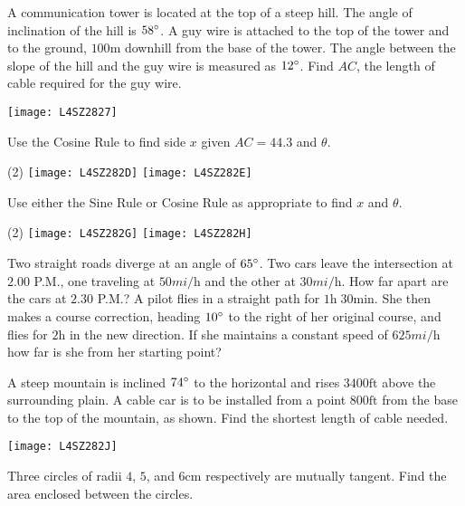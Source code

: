 \begin{Exercise}[title={Applications},label=exApplications]
\begin{multicols}{2}
	\Question A communication tower is located at the top of a steep hill. The angle of inclination
	of the hill is $58 \mbox{{\ensuremath{{}^\circ}}}$. A guy wire is attached to the top of the tower and to the ground, $100 \mbox{m}$ downhill from the base of the tower. The angle between the slope of the hill and the guy wire is measured as $12 \mbox{{\ensuremath{{}^\circ}}}$. Find $A C$, the length of cable required for the guy wire. %
	\columnbreak 
	
	\texttt{[image: L4SZ2827]}	\\
\end{multicols}	
	\Question Use the Cosine Rule to find side $x$ given $AC=44.3$ and $\theta$. 
\begin{tasks}(2)
	\task 	\texttt{[image: L4SZ282D]}%
	\task 	\texttt{[image: L4SZ282E]}%
\end{tasks}
\Question Use either the Sine Rule or Cosine Rule as appropriate to find $x$ and $\theta$.
	\begin{tasks}(2)
		\task 	\texttt{[image: L4SZ282G]}%
		\task 	\texttt{[image: L4SZ282H]}%
	\end{tasks}
\Question Two straight roads diverge at an angle of $65 \mbox{{\ensuremath{{}^\circ}}}$. Two cars leave the intersection at $2.00$ P.M., one traveling at $50 mi/\mbox{h}$ and the other at $30 mi/\mbox{h}$. How far apart are the cars at $2.30$ P.M.?%
\Question A pilot flies in a straight path for $1 \mbox{h}\; 30 \mbox{min}$. She then makes a course correction, heading $10 \mbox{{\ensuremath{{}^\circ}}}$ to the right of her original course, and flies for $2 \mbox{h}$ in the new direction. If she maintains a constant speed of $625 mi/\mbox{h}$ how far is she from her starting point?%

\begin{multicols}{2}
	\Question A steep mountain is inclined $74 \mbox{{\ensuremath{{}^\circ}}}$ to the horizontal and rises $3400 \mbox{ft}$ above the surrounding plain. A cable car is to be installed from a point $800 \mbox{ft}$ from the base to the top of the mountain, as shown. Find the shortest length of cable needed.%
	\columnbreak 
	
	\texttt{[image: L4SZ282J]}	\\
\end{multicols}	

\begin{multicols}{2}
	\Question Three circles of radii $4$, $5$, and $6 \mbox{cm}$ respectively are mutually tangent. Find the area enclosed between the circles.%
	\columnbreak 
	

\end{multicols}
\end{Exercise}
